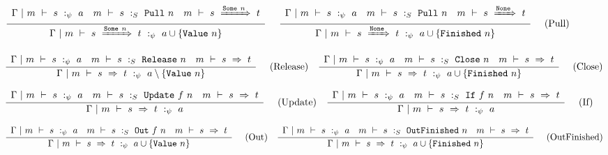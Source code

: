 
\begin{figure*}

$$
\frac {\displaystyle 
    \begin{array}{lcr}
        \Gamma ~|~ m ~\vdash~ s ~:_\psi~ a                    &
        m ~\vdash~ s ~:_S~ \mathtt{Pull}~n    &
        m ~\vdash~ s ~\xRightarrow{\mathtt{Some}~n}~ t
    \end{array}
} {\displaystyle  
    \Gamma ~|~ m ~\vdash~ s~\xRightarrow{ \mathtt{Some}~n }~t ~:_\psi~  a \cup \{ \mathtt{Value}~n \} 
} \ 
\quad
\frac {\displaystyle 
    \begin{array}{lcr}
        \Gamma ~|~ m ~\vdash~ s ~:_\psi~ a                    &
        m ~\vdash~ s ~:_S~ \mathtt{Pull}~n    &
        m ~\vdash~ s ~\xRightarrow{\mathtt{None}}~ t
    \end{array}
} {\displaystyle  
    \Gamma ~|~ m ~\vdash~ s~\xRightarrow{ \mathtt{None}}~t ~:_\psi~  a \cup \{ \mathtt{Finished}~n \} 
} \ 
\quad
\textrm{(Pull)}
$$

$$
\frac {\displaystyle 
    \begin{array}{lcr}
        \Gamma ~|~ m ~\vdash~ s ~:_\psi~ a                        &
        m ~\vdash~ s ~:_S~ \mathtt{Release}~n     &
        m ~\vdash~ s ~\Rightarrow~ t
    \end{array}
} {\displaystyle  
    \Gamma ~|~ m ~\vdash~ s~\Rightarrow~t ~:_\psi~  a \setminus \{ \mathtt{Value}~n \} 
} \ 
\quad
\textrm{(Release)}
\quad
\frac {\displaystyle 
    \begin{array}{lcr}
        \Gamma ~|~ m ~\vdash~ s ~:_\psi~ a                    &
        m ~\vdash~ s ~:_S~ \mathtt{Close}~n    &
        m ~\vdash~ s ~\Rightarrow~ t
    \end{array}
} {\displaystyle  
    \Gamma ~|~ m ~\vdash~ s~\Rightarrow~t ~:_\psi~  a \cup \{ \mathtt{Finished}~n \} 
} \ 
\quad
\textrm{(Close)}
$$

$$
\frac {\displaystyle 
    \begin{array}{lcr}
        \Gamma ~|~ m ~\vdash~ s ~:_\psi~ a                        &
        m ~\vdash~ s ~:_S~ \mathtt{Update}~f~n    &
        m ~\vdash~ s ~\Rightarrow~ t
    \end{array}
} {\displaystyle  
    \Gamma ~|~ m ~\vdash~ s~\Rightarrow~t ~:_\psi~  a 
} \ 
\quad
\textrm{(Update)}
\quad
\frac {\displaystyle 
    \begin{array}{lcr}
        \Gamma ~|~ m ~\vdash~ s ~:_\psi~ a                    &
        m ~\vdash~ s ~:_S~ \mathtt{If}~f~n    &
        m ~\vdash~ s ~\Rightarrow~ t
    \end{array}
} {\displaystyle  
    \Gamma ~|~ m ~\vdash~ s~\Rightarrow~t ~:_\psi~  a 
} \ 
\quad
\textrm{(If)}
$$

$$
\frac {\displaystyle 
    \begin{array}{lcr}
        \Gamma ~|~ m ~\vdash~ s ~:_\psi~ a                      &
        m ~\vdash~ s ~:_S~ \mathtt{Out}~f~n    &
        m ~\vdash~ s ~\Rightarrow~ t
    \end{array}
} {\displaystyle  
    \Gamma ~|~ m ~\vdash~ s~\Rightarrow~t ~:_\psi~  a \cup \{ \mathtt{Value}~n \} 
} \ 
\quad
\textrm{(Out)}
\quad
\frac {\displaystyle 
    \begin{array}{lcr}
        \Gamma ~|~ m ~\vdash~ s ~:_\psi~ a                           &
        m ~\vdash~ s ~:_S~ \mathtt{OutFinished}~n    &
        m ~\vdash~ s ~\Rightarrow~ t
    \end{array}
} {\displaystyle  
    \Gamma ~|~ m ~\vdash~ s~\Rightarrow~t ~:_\psi~  a \cup \{ \mathtt{Finished}~n \} 
} \ 
\quad
\textrm{(OutFinished)}
$$


\end{figure*}
